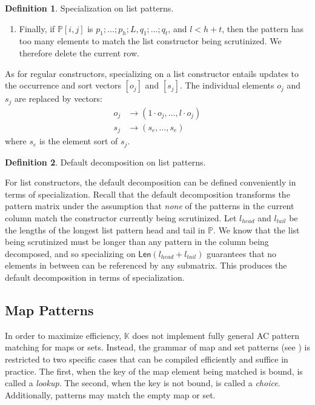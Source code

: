 \documentclass{article}
\theoremstyle{definition}
\newtheorem{definition}{Definition}[section]
\newcommand{\K}{$\mathbb{K}$\xspace}
\newcommand{\listcst}{\mathsf{Len}}
\newcommand{\PP}{\mathbb{P}}
\begin{document}
\begin{definition}{Specialization on list patterns.}
\begin{enumerate}
  \item Finally, if $ \PP[i, j] $ is $ p_1; \dots; p_h; L, q_1; \dots; q_t $,
    and $ l < h + t $, then the pattern has too many elements to match the list
    constructor being scrutinized. We therefore delete the current row.

\end{enumerate}

As for regular constructors, specializing on a list constructor entails updates
to the occurrence and sort vectors $ [o_j] $ and $ [s_j] $. The individual
elements $ o_j $ and $ s_j $ are replaced by vectors:
\begin{align*}
  o_j & \to (1 \cdot o_j, \dots, l \cdot o_j) \\
  s_j & \to (s_e, \dots, s_e)
\end{align*}
where $ s_e $ is the element sort of $ s_j $.

\end{definition}


\begin{definition}{Default decomposition on list patterns.}

For list constructors, the default decomposition can be defined conveniently in
terms of specialization. Recall that the default decomposition transforms the
pattern matrix under the assumption that \emph{none} of the patterns in the
current column match the constructor currently being scrutinized. Let $ l_{head}
$ and $ l_{tail} $ be the lengths of the longest list pattern head and tail in $
\PP $. We know that the list being scrutinized must be longer than any pattern
in the column being decomposed, and so specializing on $ \listcst(l_{head} +
l_{tail}) $ guarantees that no elements in between can be referenced by any
submatrix. This produces the default decomposition in terms of specialization.

\end{definition}



\subsection{Map Patterns} \label{sec:decomp:map}


In order to maximize efficiency, \K does not implement fully general AC pattern matching for maps or sets.
Instead, the grammar of map and set patterns (see ) is restricted
to two specific cases that can be compiled efficiently and suffice in practice.
The first, when the key
of the map element being matched is bound, is called a \emph{lookup}. The
second, when the key is not bound, is called a \emph{choice}. Additionally,
patterns may match the empty map or set.
\end{document}
